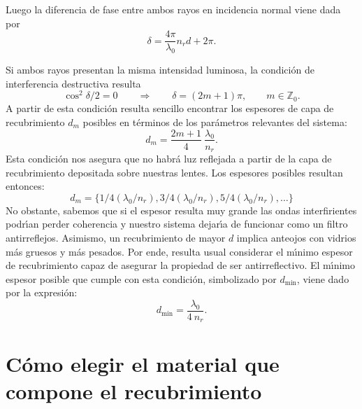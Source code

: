 \documentclass[a4paper]{article}
\newcommand{\Z}{\mathbb{Z}}
\begin{document}
Luego la diferencia de fase entre ambos rayos en incidencia normal viene 
dada por
\begin{equation}
    \delta = \frac{4\pi}{\lambda_0} n_r d + 2\pi.
\end{equation}

Si ambos rayos presentan la misma intensidad luminosa, la condici\'on de
interferencia destructiva resulta 
\begin{equation*}
    \cos^2 \delta/2 = 0 \quad \quad \Rightarrow \quad \quad \delta = (2m+1)\pi,
    \quad \quad m \in \Z_0.
\end{equation*}
A partir de esta condici\'on resulta sencillo encontrar los espesores de capa
de recubrimiento $d_m$ posibles en t\'erminos de los par\'ametros relevantes 
del sistema:
\begin{equation}
    d_m  = \frac{2m+1}{4} \: \frac{\lambda_0}{n_r}.
\end{equation}
Esta condici\'on nos asegura que no habr\'a luz reflejada a partir de la capa 
de recubrimiento depositada sobre nuestras lentes. Los espesores posibles
resultan entonces:
\begin{equation*}
    d_m = \{ 1/4 (\lambda_0/n_r),  3/4 (\lambda_0/n_r), 5/4 (\lambda_0/n_r), 
    \ldots \}
\end{equation*}
No obstante, sabemos que si el espesor resulta muy grande las ondas
interfirientes podr\'\i an perder coherencia y nuestro sistema dejar\'\i a de
funcionar como un filtro antirreflejos. Asimismo, un recubrimiento de mayor
$d$ implica anteojos con vidrios m\'as gruesos y m\'as pesados. Por ende, 
resulta usual considerar el m\'\i nimo espesor de recubrimiento capaz de
asegurar la propiedad de ser antirreflectivo. El m\'\i nimo espesor
posible que cumple con esta condici\'on, simbolizado por $d_\text{min}$,
viene dado por la
expresi\'on:
\begin{equation}
    d_\text{min} = \frac{\lambda_0}{4 \: n_r}.
\end{equation}

\section{C\'omo elegir el material que compone el recubrimiento}
\end{document}

